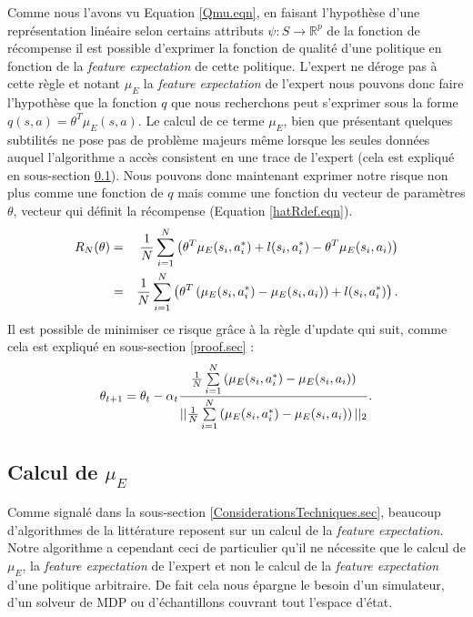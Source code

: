 \documentclass[publibook-draft]{CAp2012}
\begin{document}
Comme nous l'avons vu Equation \ref{Qmu.eqn}, en faisant l'hypothèse d'une représentation linéaire selon certains attributs $\psi : S\rightarrow \mathbb{R}^p$ de la fonction de récompense il est possible d'exprimer la fonction de qualité d'une politique en fonction de la {\it feature expectation} de cette politique. L'expert ne déroge pas à cette règle et notant $\mu_E$ la {\it feature expectation} de l'expert nous pouvons donc faire l'hypothèse que la fonction $q$ que nous recherchons peut s'exprimer sous la forme $q(s,a) = \theta^T\mu_E(s,a)$. Le calcul de ce terme $\mu_E$, bien que présentant quelques subtilités ne pose pas de problème majeurs même lorsque les seules données auquel l'algorithme a accès consistent en une trace de l'expert (cela est expliqué en sous-section \ref{calculmu.sec}). Nous pouvons donc maintenant exprimer notre risque non plus comme une fonction de $q$ mais comme une fonction du vecteur de paramètres $\theta$, vecteur qui définit la récompense (Equation \ref{hatRdef.eqn}).
   \begin{eqnarray}
   R_N(\theta) &=& {1\over N} \sum_{i=1}^N\left(\theta ^T \mu_E(s_i,a^*_i) + l(s_i,a^*_i) - \theta ^T \mu_E(s_i,a_i) \right)\\
   &=& {1\over N} \sum_{i=1}^N\left(\theta^T\left(\mu_E(s_i,a^*_i) - \mu_E(s_i,a_i)\right) + l(s_i,a^*_i)  \right).
   \end{eqnarray}
   Il est possible de minimiser ce risque grâce à la règle d'update qui suit, comme cela est expliqué en sous-section \ref{proof.sec} :
   \begin{equation}
   \theta_{t+1} = \theta_t -\alpha_t{{1\over N}\sum\limits_{i=1}^N\left(\mu_E(s_i,a^*_i) - \mu_E(s_i,a_i)\right)\over ||{1\over N}\sum\limits_{i=1}^N\left(\mu_E(s_i,a^*_i) - \mu_E(s_i,a_i)\right)||_2}.
   \end{equation}
\subsection{Calcul de $\mu_E$}
\label{calculmu.sec}
Comme signalé dans la sous-section \ref{ConsiderationsTechniques.sec}, beaucoup d'algorithmes de la littérature reposent sur un calcul de la {\it feature expectation}. Notre algorithme a cependant ceci de particulier qu'il ne nécessite que le calcul de $\mu_E$, la {\it feature expectation} de l'expert et non le calcul de la {\it feature expectation} d'une politique arbitraire. De fait cela nous épargne le besoin d'un simulateur, d'un solveur de MDP ou d'échantillons couvrant tout l'espace d'état.\\
\end{document}
